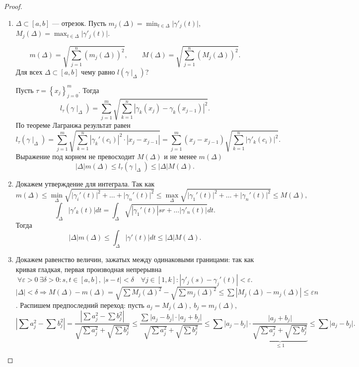 \begin{proof}
    
    $ $
    \begin{enumerate}
	\item 
    $ \Delta \subset [a, b]$ --- отрезок. Пусть $ m_j(\Delta) = \min_{t \in \Delta} \lvert \gamma'_j (t)\rvert $, $ M_j(\Delta) = \max_{t \in  \Delta} \lvert \gamma'_j(t) \rvert $.

    \[
	m(\Delta) = \sqrt{\sum_{j=1}^{n} (m_j (\Delta))^2}, \qquad
	M(\Delta) = \sqrt{\sum_{j=1}^{n} (M_j (\Delta))^2}
    .\] 
    Для всех $ \Delta \subset [a, b]$ чему равно $ l(\gamma \mid_{\Delta})$?

    Пусть $ \tau= \left\{ x_j \right\} ^{m}_{j=0}$. Тогда 
    \[
	l_{\tau}(\gamma \mid_{\Delta }) =  \sum_{j=1}^{m} \sqrt{\sum_{k=1}^{n}\left| \gamma_k(x_j) - \gamma_k(x_{j-1}) \right|^2 }
    .\] 
    По теореме Лагранжа результат равен
    \[
	l_{\tau}(\gamma \mid_{\Delta }) =  \sum_{j=1}^{m} \sqrt{\sum_{k=1}^{n}\left| \gamma_k'(c_i) \right|^2 \cdot  \left| x_j - x_{j-1} \right|  } =  \sum_{j=1}^{m}(x_j - x_{j-1}) \sqrt{\sum_{k=1}^{n} \left| \gamma'_k(c_i) \right| ^2}  
      .\]
    Выражение под корнем не превосходит $ M(\Delta)$ и не менее $ m(\Delta)$
    \[
	\left| \Delta \right| m(\Delta) \le  l_{\tau }(\gamma\mid_{\Delta}) \le  \left| \Delta \right| M(\Delta) 
    .\] 
\item  Докажем утверждение для интеграла. Так как 
    \[
	m(\Delta ) \le \min_{\Delta } \sqrt{ \lvert \gamma _i '(t)\rvert ^2 + \ldots + \lvert \gamma _n'(t) \rvert ^2} \le \max_{\Delta } \sqrt{ \lvert \gamma _1 '(t) \rvert ^2 + \ldots + \lvert \gamma _n'(t) \rvert ^2}  \le M(\Delta ) 
    ,\] 
    \[
	\int_{\Delta} \left| \gamma'_k (t)\right| dt = \int_{\Delta} \sqrt{\left| \gamma_1'(t)  \right| sr + \ldots \left|\gamma'_n(t)\right|} dt
    .\] 
    Тогда
    \[
	\left| \Delta \right| m(\Delta) \le \int_{\Delta} \left| \gamma'(t) \right| dt \le  \left| \Delta \right| M(\Delta) 
    .\] 
\item Докажем равенство величин, зажатых между одинаковыми границами:
    так как кривая гладкая, первая производная непрерывна
    \[
	\forall  \varepsilon >0 ~ \exists  \delta  >0\colon  s, t \in  [a, b] , ~ \lvert s-t \rvert < \delta  \quad \forall j \in  [1, k]\colon  \left| \gamma'_j(s) - \gamma_j'(t)  \right| < \varepsilon 
    .\] 
    $ \left| \Delta \right| < \delta  \Longrightarrow M(\Delta) - m(\Delta) = \sqrt{\sum M_j(\Delta)^2} - \sqrt{\sum m_j(\Delta)^2} \le \sum \left| M_j(\Delta) - m_j(\Delta)\right|  \le  \varepsilon  n
    $. Распишем предпоследний переход:
    пусть $ a_j = M_j(\Delta ), ~ b_j = m_j(\Delta )$,
\[
    \left| \sum a_j^2 - \sum b_j^2 \right| = \frac{\left| \sum a_j^2 - \sum b_j^2 \right| }
    {\sqrt{\sum a_j^2 }+\sqrt{ \sum b_j^2}  } \le 
    \frac{\sum_{}^{} \lvert a_j - b_j \rvert \cdot \lvert a_j + b_j \rvert }{\sqrt{\sum a_j^2 }+\sqrt{ \sum b_j^2}  } \le 
    \sum_{}^{}\lvert a_j - b_j \rvert  \cdot  \underbrace{\frac{\lvert a_j + b_j \rvert }{\sqrt{\sum a_j^2 }+\sqrt{ \sum b_j^2}  }}_{ \le 1} \le \sum_{}^{} \lvert a_j - b_j \rvert 
.\] 


\end{enumerate}
\end{proof}
